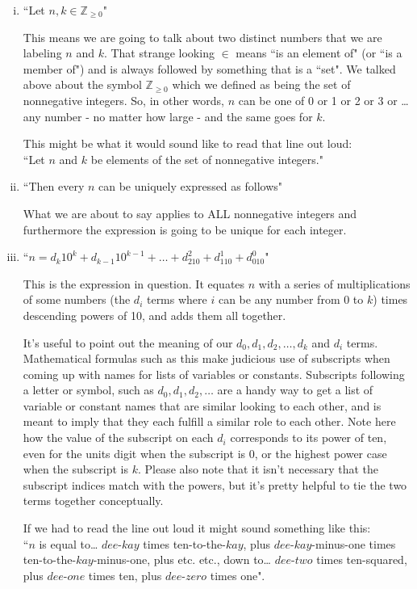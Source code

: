 \documentclass{article}
\begin{document}
\filbreak
\begin{enumerate}[i)]
\item ``Let $n,k\in \mathbb{Z}_{\ge 0}$"

This means we are going to talk about two distinct numbers
that we are labeling $n$ and $k$.
That strange looking $\in$ means ``is an element of" (or ``is a member of")
and is always followed by something that is a ``set".
We talked above about the symbol $\mathbb{Z}_{\ge 0}$ which
we defined as being the set of nonnegative integers.
So, in other words, $n$ can be one of 0 or 1 or 2 or 3 or \dots{} 
any number - no matter how large - and the same goes for $k$.

This might be what it would sound like to read that line out loud:\\
``Let $n$ and $k$ be elements of the set of nonnegative integers."

\item ``Then every $n$ can be uniquely expressed as follows"

What we are about to say applies to ALL nonnegative integers
and furthermore the expression is going to be unique for each integer.

\item ``$n=d_k10^k+d_{k-1}10^{k-1}+\dots+d_210^2+d_110^1+d_010^0$"

This is the expression in question. It equates $n$ with a series of multiplications
of some numbers (the $d_i$ terms where $i$ can be any
number from 0 to $k$) times descending powers of 10,
and adds them all together.

It's useful to point out the meaning of our $d_0,d_1,d_2,\dots{},d_k$ and $d_i$ terms.
Mathematical formulas such as this make judicious use of subscripts
when coming up with names for lists of variables or constants.
Subscripts following a letter or symbol, such as $d_0,d_1,d_2,\dots{}$
are a handy way to get a list of variable or constant names that are similar looking to each other,
and is meant to imply that they each fulfill a similar role to each other.
Note here how the value of the subscript on each $d_i$ corresponds to its power of ten,
even for the units digit when the subscript is 0,
or the highest power case when the subscript is $k$. Please also note that it
isn't necessary that the subscript indices match with the powers, but it's pretty helpful
to tie the two terms together conceptually.

If we had to read the line out loud it might sound something like this:\\
``$n$ is equal to\dots{} $dee$-$kay$ times ten-to-the-$kay$,
plus $dee$-$kay$-minus-one times ten-to-the-$kay$-minus-one,
plus etc. etc., down to\dots{} $dee$-$two$ times ten-squared,
plus $dee$-$one$ times ten, plus $dee$-$zero$ times one".


\end{enumerate}
\end{document}
